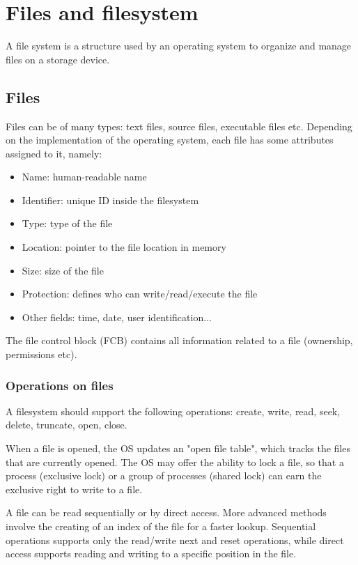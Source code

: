 \chapter{Files and filesystem}
A file system is a structure used by an operating system to organize and manage files on a storage device.

\section{Files}
Files can be of many types: text files, source files, executable files etc. Depending on the implementation of the operating system, each file has some attributes assigned to it, namely:
\begin{itemize}
    \item Name: human-readable name
    \item Identifier: unique ID inside the filesystem
    \item Type: type of the file
    \item Location: pointer to the file location in memory
    \item Size: size of the file
    \item Protection: defines who can write/read/execute the file
    \item Other fields: time, date, user identification...
\end{itemize}

The file control block (FCB) contains all information related to a file (ownership, permissions etc).

\subsection{Operations on files}
A filesystem should support the following operations: create, write, read, seek, delete, truncate, open, close.

When a file is opened, the OS updates an "open file table", which tracks the files that are currently opened. The OS may offer the ability to lock a file, so that a process (exclusive lock) or a group of processes (shared lock) can earn the exclusive right to write to a file.

A file can be read sequentially or by direct access. More advanced methods involve the creating of an index of the file for a faster lookup. Sequential operations supports only the read/write next and reset operations, while direct access supports reading and writing to a specific position in the file.


